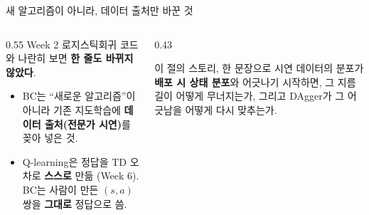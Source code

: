 \begin{frame}{새 알고리즘이 아니라, 데이터 출처만 바꾼 것}
  \begin{columns}[T]
    \begin{column}{0.55\textwidth}
      Week 2 로지스틱회귀 코드와 나란히 보면 \textbf{한 줄도
      바뀌지 않았다}.
      \begin{itemize}
        \item BC는 ``새로운 알고리즘''이 아니라 기존 지도학습에
          \textbf{데이터 출처(전문가 시연)}를 꽂아 넣은 것.
        \item Q-learning은 정답을 TD 오차로 \textbf{스스로} 만듦
          (Week 6). BC는 사람이 만든 $(s,a)$ 쌍을 \textbf{그대로}
          정답으로 씀.
      \end{itemize}
    \end{column}
    \begin{column}{0.43\textwidth}
      \begin{block}{이 절의 스토리, 한 문장으로}
        시연 데이터의 분포가 \textbf{배포 시 상태 분포}와 어긋나기
        시작하면, 그 지름길이 어떻게 무너지는가, 그리고 DAgger가
        그 어긋남을 어떻게 다시 맞추는가.
      \end{block}
    \end{column}
  \end{columns}
\end{frame}

